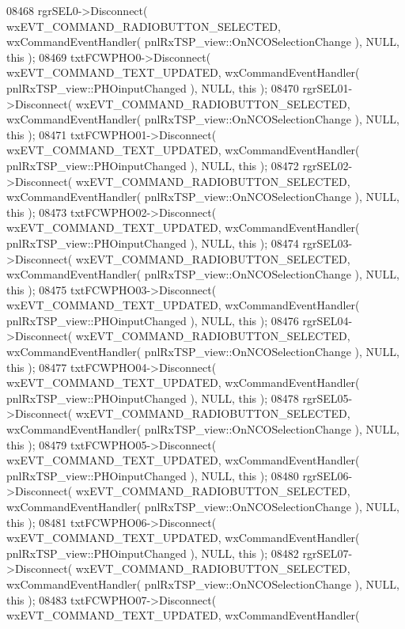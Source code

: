\begin{DoxyCode}
08468     rgrSEL0->Disconnect( wxEVT\_COMMAND\_RADIOBUTTON\_SELECTED, wxCommandEventHandler( 
      pnlRxTSP_view::OnNCOSelectionChange ), NULL, \textcolor{keyword}{this} );
08469     txtFCWPHO0->Disconnect( wxEVT\_COMMAND\_TEXT\_UPDATED, wxCommandEventHandler( 
      pnlRxTSP_view::PHOinputChanged ), NULL, \textcolor{keyword}{this} );
08470     rgrSEL01->Disconnect( wxEVT\_COMMAND\_RADIOBUTTON\_SELECTED, wxCommandEventHandler( 
      pnlRxTSP_view::OnNCOSelectionChange ), NULL, \textcolor{keyword}{this} );
08471     txtFCWPHO01->Disconnect( wxEVT\_COMMAND\_TEXT\_UPDATED, wxCommandEventHandler( 
      pnlRxTSP_view::PHOinputChanged ), NULL, \textcolor{keyword}{this} );
08472     rgrSEL02->Disconnect( wxEVT\_COMMAND\_RADIOBUTTON\_SELECTED, wxCommandEventHandler( 
      pnlRxTSP_view::OnNCOSelectionChange ), NULL, \textcolor{keyword}{this} );
08473     txtFCWPHO02->Disconnect( wxEVT\_COMMAND\_TEXT\_UPDATED, wxCommandEventHandler( 
      pnlRxTSP_view::PHOinputChanged ), NULL, \textcolor{keyword}{this} );
08474     rgrSEL03->Disconnect( wxEVT\_COMMAND\_RADIOBUTTON\_SELECTED, wxCommandEventHandler( 
      pnlRxTSP_view::OnNCOSelectionChange ), NULL, \textcolor{keyword}{this} );
08475     txtFCWPHO03->Disconnect( wxEVT\_COMMAND\_TEXT\_UPDATED, wxCommandEventHandler( 
      pnlRxTSP_view::PHOinputChanged ), NULL, \textcolor{keyword}{this} );
08476     rgrSEL04->Disconnect( wxEVT\_COMMAND\_RADIOBUTTON\_SELECTED, wxCommandEventHandler( 
      pnlRxTSP_view::OnNCOSelectionChange ), NULL, \textcolor{keyword}{this} );
08477     txtFCWPHO04->Disconnect( wxEVT\_COMMAND\_TEXT\_UPDATED, wxCommandEventHandler( 
      pnlRxTSP_view::PHOinputChanged ), NULL, \textcolor{keyword}{this} );
08478     rgrSEL05->Disconnect( wxEVT\_COMMAND\_RADIOBUTTON\_SELECTED, wxCommandEventHandler( 
      pnlRxTSP_view::OnNCOSelectionChange ), NULL, \textcolor{keyword}{this} );
08479     txtFCWPHO05->Disconnect( wxEVT\_COMMAND\_TEXT\_UPDATED, wxCommandEventHandler( 
      pnlRxTSP_view::PHOinputChanged ), NULL, \textcolor{keyword}{this} );
08480     rgrSEL06->Disconnect( wxEVT\_COMMAND\_RADIOBUTTON\_SELECTED, wxCommandEventHandler( 
      pnlRxTSP_view::OnNCOSelectionChange ), NULL, \textcolor{keyword}{this} );
08481     txtFCWPHO06->Disconnect( wxEVT\_COMMAND\_TEXT\_UPDATED, wxCommandEventHandler( 
      pnlRxTSP_view::PHOinputChanged ), NULL, \textcolor{keyword}{this} );
08482     rgrSEL07->Disconnect( wxEVT\_COMMAND\_RADIOBUTTON\_SELECTED, wxCommandEventHandler( 
      pnlRxTSP_view::OnNCOSelectionChange ), NULL, \textcolor{keyword}{this} );
08483     txtFCWPHO07->Disconnect( wxEVT\_COMMAND\_TEXT\_UPDATED, wxCommandEventHandler( 

\end{DoxyCode}
